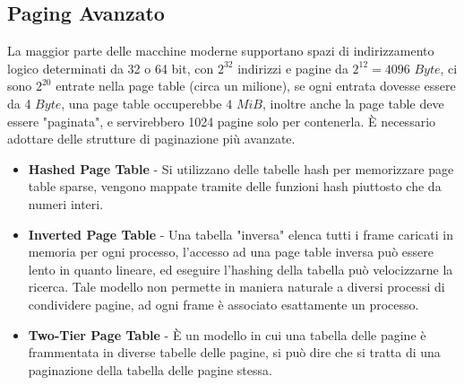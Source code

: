 \documentclass[12pt, letterpaper]{article}
\begin{document}
\subsection{Paging Avanzato}
La maggior parte delle macchine moderne supportano spazi di indirizzamento logico determinati da 32 o 64 bit,
con \(2^{32}\) indirizzi e pagine da \(2^{12}=4096\) \(Byte\), ci sono \(2^20\) entrate nella page table (circa un 
milione), se ogni entrata dovesse essere da 4 \(Byte\), una page table occuperebbe \(4\) \(MiB\), inoltre anche la page 
table deve essere "paginata", e servirebbero 1024 pagine solo per contenerla. È necessario adottare delle strutture di 
paginazione più avanzate.
\begin{itemize}
    \item \textbf{Hashed Page Table} - Si utilizzano delle tabelle hash per memorizzare page table sparse, vengono 
    mappate tramite delle funzioni hash piuttosto che da numeri interi.
    \item  \textbf{Inverted Page Table} - Una tabella "inversa" elenca tutti i frame caricati in memoria per ogni 
    processo, l'accesso ad una page table inversa può essere lento in quanto lineare, ed eseguire l'hashing della 
    tabella può velocizzarne la ricerca. Tale modello non permette in maniera naturale a diversi processi di 
    condividere pagine, ad ogni frame è associato esattamente un processo.
    \item \textbf{Two-Tier Page Table} - È un modello in cui una tabella delle pagine è frammentata in diverse tabelle delle pagine,
    si può dire che si tratta di una paginazione della tabella delle pagine stessa.
\end{itemize}
\end{document}
